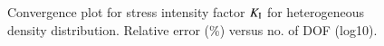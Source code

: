 \documentclass[review]{elsarticle}
\numberwithin{equation}{section}
\begin{document}
\begin{figure}[h]
	\centering
	\caption{Convergence plot for stress intensity factor $K_{\rm I}$ for heterogeneous density distribution. Relative error (\%) versus no. of DOF (log10).}
	\label{fig:covergencefdm}
\end{figure}
\end{document}

